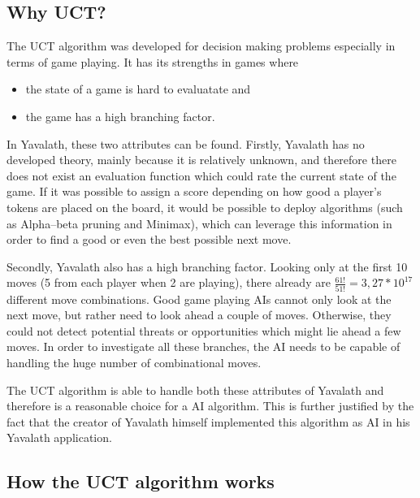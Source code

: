 \documentclass[german]{report}
\begin{document}
\subsection{Why UCT?}
The UCT algorithm was developed for decision making problems especially in terms
of game playing. It has its strengths in games where
\begin{itemize}
	\item the state of a game is hard to evaluatate and
	\item the game has a high branching factor.
\end{itemize}

In Yavalath, these two attributes can be found. Firstly, Yavalath has no
developed theory, mainly because it is relatively unknown, and therefore there
does not exist an evaluation function which could rate the current state of the
game. If it was possible to assign a score depending on how good a player's
tokens are placed on the board, it would be possible to deploy algorithms (such
as Alpha–beta pruning and Minimax), which can leverage this information in order
to find a good or even the best possible next move.

Secondly, Yavalath also has a high branching factor. Looking only at the first
10 moves (5 from each player when 2 are playing), there already are
\(\frac{61!}{51!}=3,27*10^17\) different move combinations. Good game playing
AIs cannot only look at the next move, but rather need to look ahead a couple of
moves. Otherwise, they could not detect potential threats or opportunities which
might lie ahead a few moves. In order to investigate all these branches, the AI
needs to be capable of handling the huge number of combinational moves.

The UCT algorithm is able to handle both these attributes of Yavalath and
therefore is a reasonable choice for a AI algorithm. This is further justified
by the fact that the creator of Yavalath himself implemented this algorithm as
AI in his Yavalath application. %

\subsection{How the UCT algorithm works}
\end{document}
